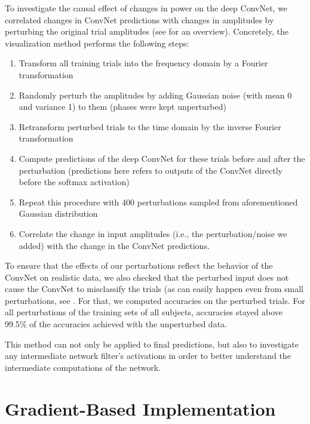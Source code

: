     To investigate the causal effect of changes in power on the deep
ConvNet, we correlated changes in ConvNet predictions with changes in
amplitudes by perturbing the original trial amplitudes (see
 for an overview).
Concretely, the visualization method performs the following steps: 

\begin{enumerate}
\item
Transform all training trials into the frequency domain by a Fourier
transformation 
\item
Randomly perturb the amplitudes by adding Gaussian
noise (with mean 0 and variance 1) to them (phases were kept
unperturbed) 
\item
Retransform perturbed trials to the time domain by the
inverse Fourier transformation
\item
Compute predictions of the deep
ConvNet for these trials before and after the perturbation (predictions
here refers to outputs of the ConvNet directly before the softmax
activation)
\item
Repeat this procedure with 400 perturbations sampled from
aforementioned Gaussian distribution
\item
Correlate the change in input
amplitudes (i.e., the perturbation/noise we added) with the change in
the ConvNet predictions.
\end{enumerate}


To ensure that the effects of our perturbations reflect the behavior of
the ConvNet on realistic data, we also checked that the perturbed input
does not cause the ConvNet to misclassify the trials (as can easily
happen even from small perturbations, see
\citep{szegedy_intriguing_2014}. For that, we computed
accuracies on the perturbed trials. For all perturbations of the
training sets of all subjects, accuracies stayed above 99.5\% of the
accuracies achieved with the unperturbed data.

This method can not only be applied to final predictions, but also to
investigate any intermediate network filter's activations in order to
better understand the intermediate computations of the network.


\section{Gradient-Based
Implementation}\label{gradient-based-implementation}

